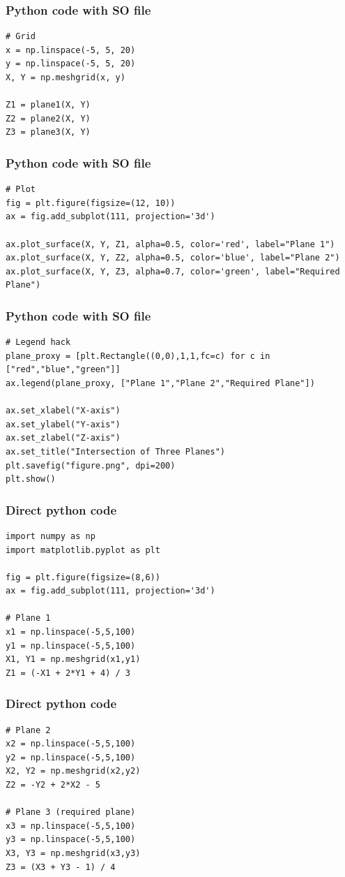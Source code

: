 \documentclass{beamer}
\begin{document}
\begin{frame}[fragile]
\frametitle{Python code with SO file}
\begin{lstlisting}
# Grid
x = np.linspace(-5, 5, 20)
y = np.linspace(-5, 5, 20)
X, Y = np.meshgrid(x, y)

Z1 = plane1(X, Y)
Z2 = plane2(X, Y)
Z3 = plane3(X, Y)
\end{lstlisting}
\end{frame}
\begin{frame}[fragile]
\frametitle{Python code with SO file}
\begin{lstlisting}
# Plot
fig = plt.figure(figsize=(12, 10))
ax = fig.add_subplot(111, projection='3d')

ax.plot_surface(X, Y, Z1, alpha=0.5, color='red', label="Plane 1")
ax.plot_surface(X, Y, Z2, alpha=0.5, color='blue', label="Plane 2")
ax.plot_surface(X, Y, Z3, alpha=0.7, color='green', label="Required Plane")
\end{lstlisting}
\end{frame}
\begin{frame}[fragile]
\frametitle{Python code with SO file}
\begin{lstlisting}
# Legend hack
plane_proxy = [plt.Rectangle((0,0),1,1,fc=c) for c in ["red","blue","green"]]
ax.legend(plane_proxy, ["Plane 1","Plane 2","Required Plane"])

ax.set_xlabel("X-axis")
ax.set_ylabel("Y-axis")
ax.set_zlabel("Z-axis")
ax.set_title("Intersection of Three Planes")
plt.savefig("figure.png", dpi=200)
plt.show()
\end{lstlisting}
\end{frame}
\begin{frame}[fragile]
\frametitle{Direct python code}
\begin{lstlisting}
import numpy as np
import matplotlib.pyplot as plt

fig = plt.figure(figsize=(8,6))
ax = fig.add_subplot(111, projection='3d')

# Plane 1
x1 = np.linspace(-5,5,100)
y1 = np.linspace(-5,5,100)
X1, Y1 = np.meshgrid(x1,y1)
Z1 = (-X1 + 2*Y1 + 4) / 3
\end{lstlisting}
\end{frame}
\begin{frame}[fragile]
\frametitle{Direct python code}
\begin{lstlisting}
# Plane 2
x2 = np.linspace(-5,5,100)
y2 = np.linspace(-5,5,100)
X2, Y2 = np.meshgrid(x2,y2)
Z2 = -Y2 + 2*X2 - 5

# Plane 3 (required plane)
x3 = np.linspace(-5,5,100)
y3 = np.linspace(-5,5,100)
X3, Y3 = np.meshgrid(x3,y3)
Z3 = (X3 + Y3 - 1) / 4
\end{lstlisting}
\end{frame}
\end{document}
